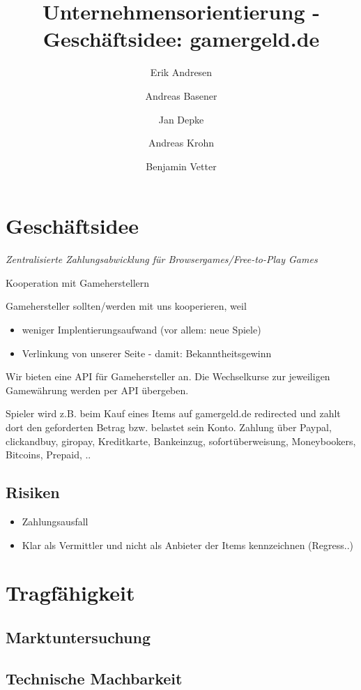 \documentclass[a4paper,10pt]{article}
\title{Unternehmensorientierung - Geschäftsidee: gamergeld.de}
\author{Erik Andresen \and Andreas Basener \and Jan Depke \and Andreas Krohn \and Benjamin Vetter}
\begin{document}
\maketitle

\section{Geschäftsidee}
\emph{Zentralisierte Zahlungsabwicklung für Browsergames/Free-to-Play Games}

Kooperation mit Gameherstellern

Gamehersteller sollten/werden mit uns kooperieren, weil
\begin{itemize}
  \item weniger Implentierungsaufwand (vor allem: neue Spiele)
  \item Verlinkung von unserer Seite - damit: Bekanntheitsgewinn
\end{itemize}

Wir bieten eine API für Gamehersteller an.
Die Wechselkurse zur jeweiligen Gamewährung werden per API übergeben.

Spieler wird z.B. beim Kauf eines Items auf gamergeld.de redirected und zahlt dort den geforderten Betrag bzw. belastet sein Konto.
Zahlung über Paypal, clickandbuy, giropay, Kreditkarte, Bankeinzug, sofortüberweisung, Moneybookers, Bitcoins, Prepaid, ..

\subsection{Risiken}
\begin{itemize}
  \item Zahlungsausfall
  \item Klar als Vermittler und nicht als Anbieter der Items kennzeichnen (Regress..)
\end{itemize}

\section{Tragfähigkeit}\label{labelTragfaehigkeit}

\subsection{Marktuntersuchung}\label{labelMarktuntersuchung}


\subsection{Technische Machbarkeit}\label{labelTechMach}


\end{document}
